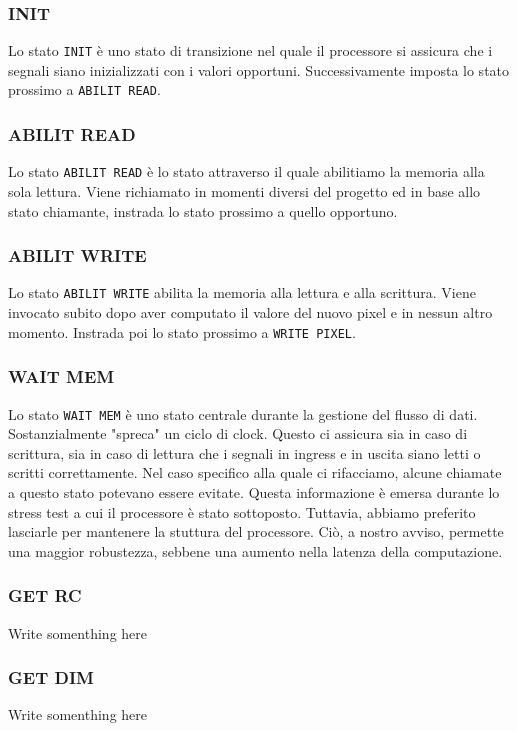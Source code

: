 \documentclass{article}
\begin{document}
\subsubsection{INIT}
Lo stato \texttt{INIT} è uno stato di transizione nel quale il processore si assicura che i segnali siano inizializzati con i valori opportuni. Successivamente imposta lo stato prossimo a \texttt{ABILIT READ}.

\subsubsection{ABILIT READ}
Lo stato \texttt{ABILIT READ} è lo stato attraverso il quale abilitiamo la memoria alla sola lettura. Viene richiamato in momenti diversi del progetto ed in base allo stato chiamante, instrada lo stato prossimo a quello opportuno.

\subsubsection{ABILIT WRITE}
Lo stato \texttt{ABILIT WRITE} abilita la memoria alla lettura e alla scrittura. Viene invocato subito dopo aver computato il valore del nuovo pixel e in nessun altro momento. Instrada poi lo stato prossimo a \texttt{WRITE PIXEL}.

\subsubsection{WAIT MEM}
Lo stato \texttt{WAIT MEM} è uno stato centrale durante la gestione del flusso di dati. Sostanzialmente "spreca" un ciclo di clock. Questo ci assicura sia in caso di scrittura, sia in caso di lettura che i segnali in ingress e in uscita siano letti o scritti correttamente. Nel caso specifico alla quale ci rifacciamo, alcune chiamate a questo stato potevano essere evitate. Questa informazione è emersa durante lo stress test a cui il processore è stato sottoposto. Tuttavia, abbiamo preferito lasciarle per mantenere la stuttura del processore. Ciò, a nostro avviso, permette una maggior robustezza, sebbene una aumento nella latenza della computazione.

\subsubsection{GET RC}
Write somenthing here

\subsubsection{GET DIM}
Write somenthing here
\end{document}
